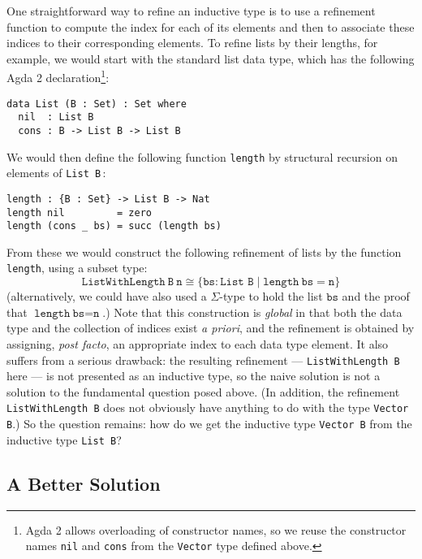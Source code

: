 \documentclass{LMCS}
\newcommand{\sepbar}{\mathrel|}
\begin{document}
One straightforward way to refine an inductive type is to use a
refinement function to compute the index for each of its elements and
then to associate these indices to their corresponding elements. To
refine lists by their lengths, for example, we would start with the
standard list data type, which has the following Agda 2
declaration\footnote{Agda 2 allows overloading of constructor names,
  so we reuse the constructor names \texttt{nil} and \texttt{cons}
  from the \texttt{Vector} type defined above.}:
\begin{verbatim}
data List (B : Set) : Set where
  nil  : List B
  cons : B -> List B -> List B
\end{verbatim}
We would then define the following function \verb|length| by
structural recursion on elements of \texttt{List B}\,:
\begin{verbatim}
length : {B : Set} -> List B -> Nat
length nil         = zero
length (cons _ bs) = succ (length bs)
\end{verbatim}
From these we would construct the following refinement of lists by the
function \verb|length|, using a subset type: 
\begin{equation}\label{eqn:vector}
  \texttt{ListWithLength}\ \texttt{B}\ \texttt{n} \cong \{ \texttt{bs} :
  \texttt{List B}
  \sepbar \texttt{length}\ \texttt{bs} = \texttt{n} \}
\end{equation}
(alternatively, we could have also used a $\Sigma$-type to hold the
list $\texttt{bs}$ and the proof that $\texttt{length}\ \texttt{bs} =
\texttt{n}$.)  Note that this construction is {\em global} in that
both the data type and the collection of indices exist {\em a priori},
and the refinement is obtained by assigning, {\em post facto}, an
appropriate index to each data type element. It also suffers from a
serious drawback: the resulting refinement --- \verb|ListWithLength B|
here --- is not presented as an inductive type, so the naive solution
is not a solution to the fundamental question posed above. (In
addition, the refinement \verb|ListWithLength B| does not obviously
have anything to do with the type \texttt{Vector B}.) So the question
remains: how do we get the inductive type \texttt{Vector B} from the
inductive type \texttt{List B}?

\subsection{A Better Solution}\label{sec:better-solution}
\end{document}
